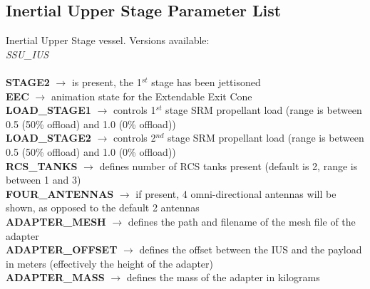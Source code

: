 \documentclass[Space_Shuttle_Ultra_Manual.tex]{subfiles}
\begin{document}
\begin{multicols*}{2}
\subsection{Inertial Upper Stage Parameter List}
\noindent
Inertial Upper Stage vessel. Versions available:
\\
\textit{SSU\_IUS}
\\
\\
\textbf{STAGE2} $\rightarrow$ is present, the 1$^{st}$ stage has been jettisoned
\\
\textbf{EEC} $\rightarrow$ animation state for the Extendable Exit Cone
\\
\textbf{LOAD\_STAGE1} $\rightarrow$ controls 1$^{st}$ stage SRM propellant load (range is between 0.5 (50\% offload) and 1.0 (0\% offload))
\\
\textbf{LOAD\_STAGE2} $\rightarrow$ controls 2$^{nd}$ stage SRM propellant load (range is between 0.5 (50\% offload) and 1.0 (0\% offload))
\\
\textbf{RCS\_TANKS} $\rightarrow$ defines number of RCS tanks present (default is 2, range is between 1 and 3)
\\
\textbf{FOUR\_ANTENNAS} $\rightarrow$ if present, 4 omni-directional antennas will be shown, as opposed to the default 2 antennas
\\
\textbf{ADAPTER\_MESH} $\rightarrow$ defines the path and filename of the mesh file of the adapter
\\
\textbf{ADAPTER\_OFFSET} $\rightarrow$ defines the offset between the IUS and the payload in meters (effectively the height of the adapter)
\\
\textbf{ADAPTER\_MASS} $\rightarrow$ defines the mass of the adapter in kilograms

\end{multicols*}
\end{document}
